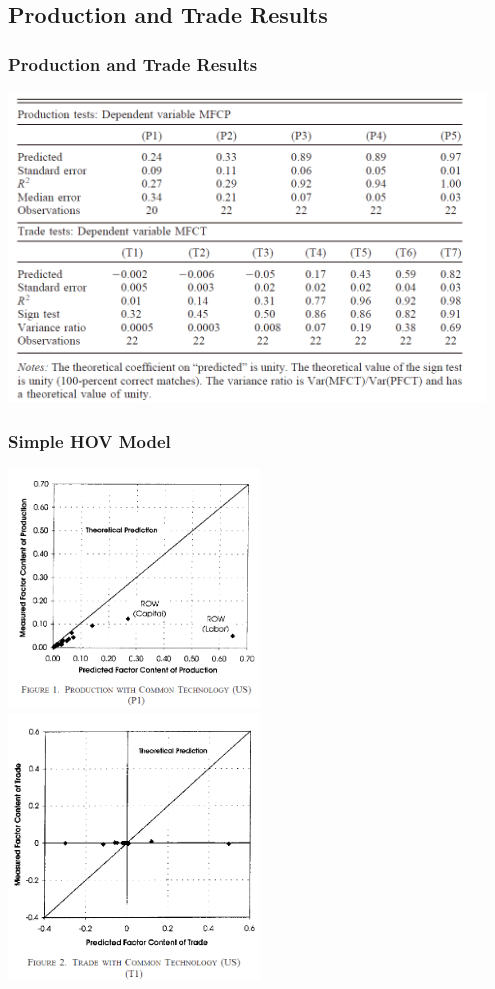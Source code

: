 \documentclass[xcolor=svgnames,10pt]{beamer}
\begin{document}
\subsection{Production and Trade Results}
\begin{frame}[c]\frametitle{Production and Trade Results}
\centering
\includegraphics[width=0.95\textwidth]{resu.png}
\end{frame}

\begin{frame}[c]\frametitle{Simple HOV Model}
\includegraphics[width=0.5\textwidth]{P1.png}
\includegraphics[width=0.5\textwidth]{T1.png}
\end{frame}
\end{document}
